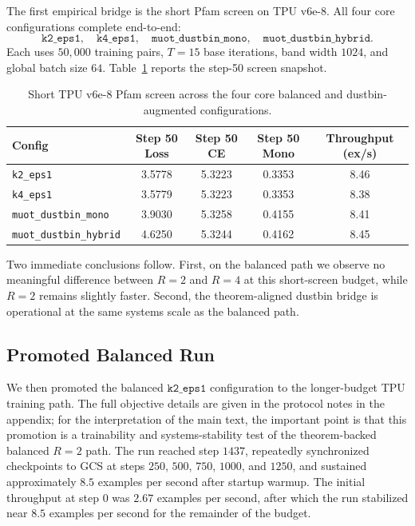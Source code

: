 The first empirical bridge is the short Pfam screen on TPU v6e-8. All four core configurations complete end-to-end:
\[
\texttt{k2\_eps1},\quad
\texttt{k4\_eps1},\quad
\texttt{muot\_dustbin\_mono},\quad
\texttt{muot\_dustbin\_hybrid}.
\]
Each uses $50{,}000$ training pairs, $T=15$ base iterations, band width $1024$, and global batch size $64$. Table~\ref{tab:screen_unified} reports the step-50 screen snapshot.

\begin{table}[h]
    \centering
    \begin{tabular}{@{}lcccc@{}}
        \toprule
        Config & Step 50 Loss & Step 50 CE & Step 50 Mono & Throughput (ex/s) \\
        \midrule
        \texttt{k2\_eps1} & 3.5778 & 5.3223 & 0.3353 & 8.46 \\
        \texttt{k4\_eps1} & 3.5779 & 5.3223 & 0.3353 & 8.38 \\
        \texttt{muot\_dustbin\_mono} & 3.9030 & 5.3258 & 0.4155 & 8.41 \\
        \texttt{muot\_dustbin\_hybrid} & 4.6250 & 5.3244 & 0.4162 & 8.45 \\
        \bottomrule
    \end{tabular}
    \caption{Short TPU v6e-8 Pfam screen across the four core balanced and dustbin-augmented configurations.}
    \label{tab:screen_unified}
\end{table}

Two immediate conclusions follow. First, on the balanced path we observe no meaningful difference between $R=2$ and $R=4$ at this short-screen budget, while $R=2$ remains slightly faster. Second, the theorem-aligned dustbin bridge is operational at the same systems scale as the balanced path.

\subsection{Promoted Balanced Run}

We then promoted the balanced $\texttt{k2\_eps1}$ configuration to the longer-budget TPU training path. The full objective details are given in the protocol notes in the appendix; for the interpretation of the main text, the important point is that this promotion is a trainability and systems-stability test of the theorem-backed balanced $R=2$ path. The run reached step $1437$, repeatedly synchronized checkpoints to GCS at steps $250$, $500$, $750$, $1000$, and $1250$, and sustained approximately $8.5$ examples per second after startup warmup. The initial throughput at step $0$ was $2.67$ examples per second, after which the run stabilized near $8.5$ examples per second for the remainder of the budget.

